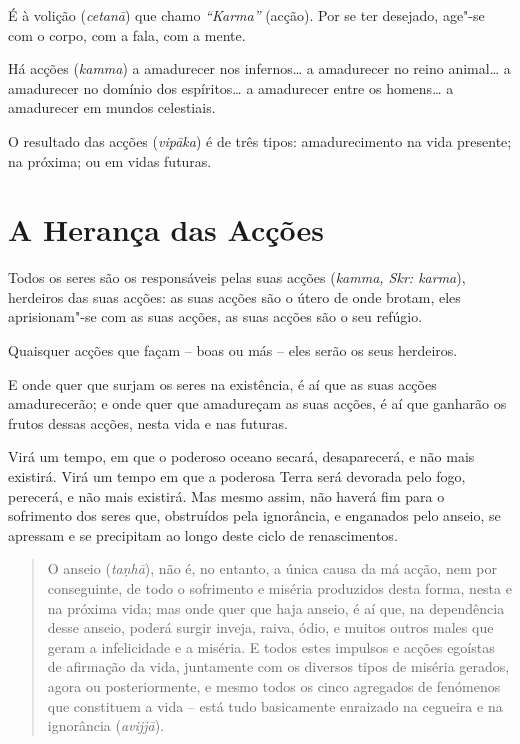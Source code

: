 É à volição (\emph{cetanā}) que chamo \emph{``Karma''} (acção). Por se ter
desejado, age"-se com o corpo, com a fala, com a mente.

Há acções (\emph{kamma}) a amadurecer nos infernos\ldots{} a amadurecer no reino
animal\ldots{} a amadurecer no domínio dos espíritos\ldots{} a amadurecer entre
os homens\ldots{} a amadurecer em mundos celestiais.

O resultado das acções (\emph{vipāka}) é de três tipos: amadurecimento na vida
presente; na próxima; ou em vidas futuras.


\section{A Herança das Acções}

Todos os seres são os responsáveis pelas suas acções (\emph{kamma, Skr: karma}),
herdeiros das suas acções: as suas acções são o útero de onde brotam, eles
aprisionam"-se com as suas acções, as suas acções são o seu refúgio.

Quaisquer acções que façam -- boas ou más -- eles serão os seus herdeiros.


E onde quer que surjam os seres na existência, é aí que as suas acções
amadurecerão; e onde quer que amadureçam as suas acções, é aí que ganharão os
frutos dessas acções, nesta vida e nas futuras.


Virá um tempo, em que o poderoso oceano secará, desaparecerá, e não mais
existirá. Virá um tempo em que a poderosa Terra será devorada pelo fogo,
perecerá, e não mais existirá. Mas mesmo assim, não haverá fim para o sofrimento
dos seres que, obstruídos pela ignorância, e enganados pelo anseio, se apressam
e se precipitam ao longo deste ciclo de renascimentos.


\clearpage

\begin{quote}
  O anseio (\emph{ta\d{n}hā}), não é, no entanto, a única causa da má acção, nem por
  conseguinte, de todo o sofrimento e miséria produzidos desta forma, nesta e na
  próxima vida; mas onde quer que haja anseio, é aí que, na dependência desse
  anseio, poderá surgir inveja, raiva, ódio, e muitos outros males que geram a
  infelicidade e a miséria. E todos estes impulsos e acções egoístas de
  afirmação da vida, juntamente com os diversos tipos de miséria gerados, agora
  ou posteriormente, e mesmo todos os cinco agregados de fenómenos que
  constituem a vida -- está tudo basicamente enraizado na cegueira e na
  ignorância (\emph{avijjā}).
\end{quote}


